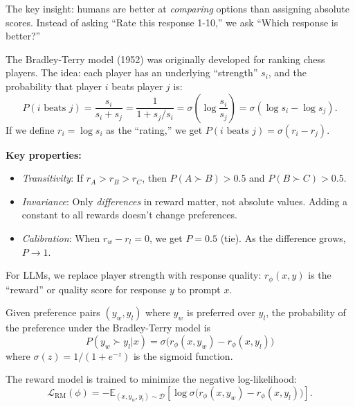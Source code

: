 The key insight: humans are better at \emph{comparing} options than assigning absolute scores. Instead of asking ``Rate this response 1-10,'' we ask ``Which response is better?''

\begin{remark}
    The Bradley-Terry model (1952) was originally developed for ranking chess players. The idea: each player has an underlying ``strength'' $s_i$, and the probability that player $i$ beats player $j$ is:
    \[
        P(i \text{ beats } j) = \frac{s_i}{s_i + s_j} = \frac{1}{1 + s_j/s_i} = \sigma\left(\log \frac{s_i}{s_j}\right) = \sigma(\log s_i - \log s_j).
    \]
    If we define $r_i = \log s_i$ as the ``rating,'' we get $P(i \text{ beats } j) = \sigma(r_i - r_j)$.

    \textbf{Key properties:}
    \begin{itemize}
        \item \emph{Transitivity}: If $r_A > r_B > r_C$, then $P(A \succ B) > 0.5$ and $P(B \succ C) > 0.5$.
        \item \emph{Invariance}: Only \emph{differences} in reward matter, not absolute values. Adding a constant to all rewards doesn't change preferences.
        \item \emph{Calibration}: When $r_w - r_l = 0$, we get $P = 0.5$ (tie). As the difference grows, $P \to 1$.
    \end{itemize}

    For LLMs, we replace player strength with response quality: $r_\phi(x, y)$ is the ``reward'' or quality score for response $y$ to prompt $x$.
\end{remark}

\begin{definition}
    Given preference pairs $(y_w, y_l)$ where $y_w$ is preferred over $y_l$, the probability of the preference under the Bradley-Terry model is
    \[
        P(y_w \succ y_l | x) = \sigma\bigl(r_\phi(x, y_w) - r_\phi(x, y_l)\bigr)
    \]
    where $\sigma(z) = 1/(1 + e^{-z})$ is the sigmoid function.
\end{definition}

\begin{definition}
    The reward model is trained to minimize the negative log-likelihood:
    \[
        \mathcal{L}_{\text{RM}}(\phi) = -\mathbb{E}_{(x, y_w, y_l) \sim \mathcal{D}} \left[ \log \sigma\bigl(r_\phi(x, y_w) - r_\phi(x, y_l)\bigr) \right].
    \]
\end{definition}

